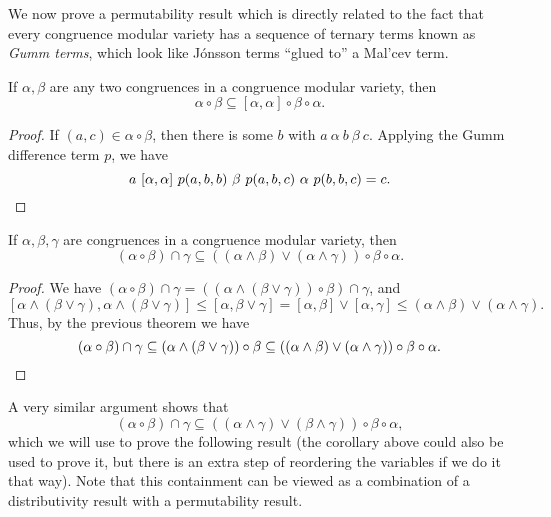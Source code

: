 \begin{appendices}
We now prove a permutability result which is directly related to the fact that every congruence modular variety has a sequence of ternary terms known as \emph{Gumm terms}, which look like J\'onsson terms ``glued to'' a Mal'cev term.

\begin{thm}\label{commutator-permute} If $\alpha, \beta$ are any two congruences in a congruence modular variety, then
\[
\alpha \circ \beta \subseteq [\alpha,\alpha] \circ \beta \circ \alpha.
\]
\end{thm}
\begin{proof} If $(a,c) \in \alpha \circ \beta$, then there is some $b$ with $a\ \alpha\ b\ \beta\ c$. Applying the Gumm difference term $p$, we have
\[
a\ [\alpha,\alpha]\ p(a,b,b)\ \beta\ p(a,b,c)\ \alpha\ p(b,b,c) = c.\qedhere
\]
\end{proof}

\begin{cor} If $\alpha, \beta, \gamma$ are congruences in a congruence modular variety, then
\[
(\alpha \circ \beta) \cap \gamma \subseteq ((\alpha \wedge \beta)\vee (\alpha \wedge \gamma))\circ \beta \circ \alpha.
\]
\end{cor}
\begin{proof} We have $(\alpha \circ \beta) \cap \gamma = ((\alpha \wedge (\beta\vee \gamma))\circ \beta) \cap \gamma$, and
\[
[\alpha \wedge (\beta\vee \gamma),\alpha \wedge (\beta \vee \gamma)] \le [\alpha, \beta \vee \gamma] = [\alpha, \beta] \vee [\alpha, \gamma] \le (\alpha \wedge \beta) \vee (\alpha \wedge \gamma).
\]
Thus, by the previous theorem we have
\[
(\alpha \circ \beta) \cap \gamma \subseteq (\alpha \wedge (\beta\vee \gamma))\circ \beta \subseteq ((\alpha \wedge \beta)\vee (\alpha \wedge \gamma))\circ \beta \circ \alpha.\qedhere
\]
\end{proof}

A very similar argument shows that
\[
(\alpha \circ \beta) \cap \gamma \subseteq ((\alpha \wedge \gamma)\vee (\beta \wedge \gamma))\circ \beta \circ \alpha,
\]
which we will use to prove the following result (the corollary above could also be used to prove it, but there is an extra step of reordering the variables if we do it that way). Note that this containment can be viewed as a combination of a distributivity result with a permutability result.


\end{appendices}
